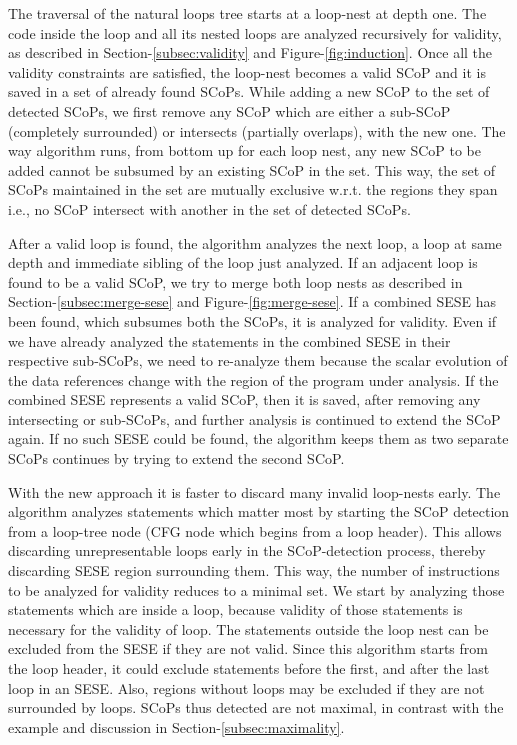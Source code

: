 \documentclass{sigplanconf}
\begin{document}
The traversal of the natural loops tree starts at a loop-nest at depth one.  The
code inside the loop and all its nested loops are analyzed recursively for
validity, as described in Section-\ref{subsec:validity} and
Figure-\ref{fig:induction}.  Once all the validity constraints are satisfied,
the loop-nest becomes a valid SCoP and it is saved in a set of
already found SCoPs. While adding a new SCoP to the set of detected SCoPs, we
first remove any SCoP which are either a sub-SCoP (completely surrounded) or
intersects (partially overlaps), with the new one. The way algorithm runs, from
bottom up for each loop nest, any new SCoP to be added cannot be subsumed by an
existing SCoP in the set. This way, the set of SCoPs maintained in the set are
mutually exclusive w.r.t. the regions they span i.e., no SCoP intersect with
another in the set of detected SCoPs.

After a valid loop is found, the algorithm analyzes the next loop, a loop at
same depth and immediate sibling of the loop just analyzed.  If an adjacent loop
is found to be a valid SCoP, we try to merge both loop nests as described in
Section-\ref{subsec:merge-sese} and Figure-\ref{fig:merge-sese}.  If a combined
SESE has been found, which subsumes both the SCoPs, it is analyzed for
validity. Even if we have already analyzed the statements in the combined SESE
in their respective sub-SCoPs, we need to re-analyze them because the scalar
evolution of the data references change with the region of the program under
analysis. If the combined SESE represents a valid SCoP, then it is saved, after
removing any intersecting or sub-SCoPs, and further analysis is continued to
extend the SCoP again.  If no such SESE could be found, the algorithm keeps them
as two separate SCoPs continues by trying to extend the second SCoP.

With the new approach it is faster to discard many invalid loop-nests early. The
algorithm analyzes statements which matter most by starting the SCoP detection
from a loop-tree node (CFG node which begins from a loop header). This allows
discarding unrepresentable loops early in the SCoP-detection process, thereby
discarding SESE region surrounding them.  This way, the number of instructions
to be analyzed for validity reduces to a minimal set.  We start by analyzing
those statements which are inside a loop, because validity of those statements
is necessary for the validity of loop.  The statements outside the loop nest can
be excluded from the SESE if they are not valid.  Since this algorithm starts
from the loop header, it could exclude statements before the first, and after
the last loop in an SESE.  Also, regions without loops may be excluded if they
are not surrounded by loops.  SCoPs thus detected are not maximal, in contrast
with the example and discussion in Section-\ref{subsec:maximality}.
\end{document}
